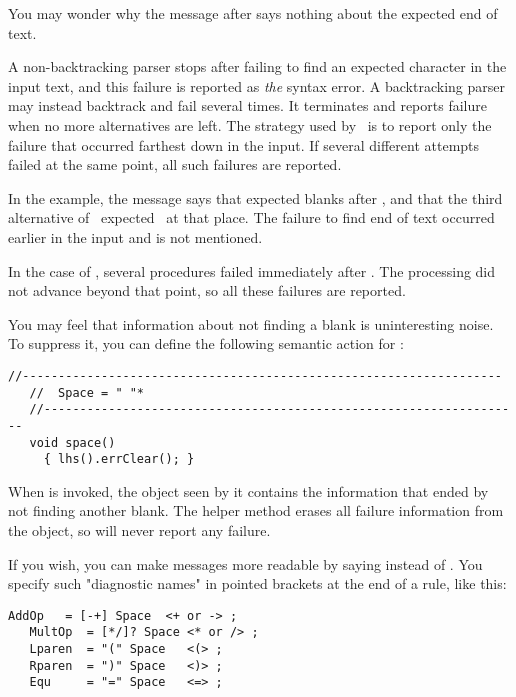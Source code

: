 \medskip
You may wonder why the message after  says nothing about the expected end of text.

A non-backtracking parser stops after failing to find an expected character
in the input text, and this failure
is reported as \emph{the} syntax error.
A backtracking parser may instead backtrack
and fail several times.  
It terminates and reports failure when no more
alternatives are left.
The strategy used by \Mouse\ is to report only the failure that occurred 
farthest down in the input.
If several different attempts failed at the same point,
all such failures are reported.

In the example, the message says that  expected blanks after ,
and that the third alternative of \Factor\ expected \Sum\ at that place.
The failure to find end of text occurred earlier in the input and is not mentioned.

\medskip
In the case of , several procedures failed immediately after .
The processing did not advance beyond that point, so all these failures are reported.

You may feel that information about 
 not finding a blank is uninteresting noise. 
To suppress it, you can define the following semantic action for :
%
\small
\begin{Verbatim}[frame=single,framesep=2mm,samepage=true,xleftmargin=15mm,xrightmargin=15mm,baselinestretch=0.8]
   //-------------------------------------------------------------------
   //  Space = " "*
   //-------------------------------------------------------------------
   void space()
     { lhs().errClear(); }
\end{Verbatim}
\normalsize
%
When  is invoked, the  object seen by it
contains the information that  ended
by not finding another blank.
The helper method  erases all failure information
from the  object, so  will never report any failure.

If you wish, you can make messages more readable by saying
 instead of .
You specify such "diagnostic names" in pointed brackets at the end of a rule, like this:

\small
\begin{Verbatim}[frame=single,framesep=2mm,samepage=true,xleftmargin=15mm,xrightmargin=15mm,baselinestretch=0.8]
   AddOp   = [-+] Space  <+ or -> ;
   MultOp  = [*/]? Space <* or /> ;
   Lparen  = "(" Space   <(> ;
   Rparen  = ")" Space   <)> ;
   Equ     = "=" Space   <=> ;
\end{Verbatim}
\normalsize

